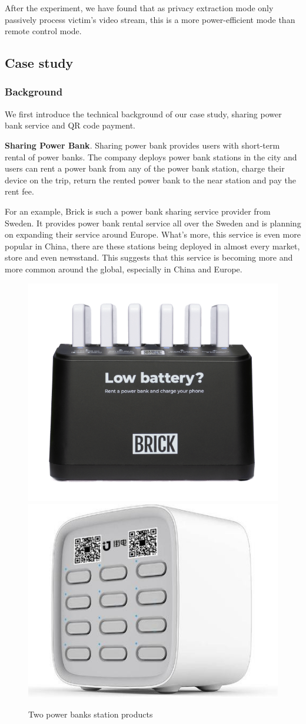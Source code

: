 After the experiment, we have found that as privacy extraction mode only passively process victim's video stream, this is a more power-efficient mode than remote control mode.

\subsection{Case study}
\label{subsec:case_study}
\subsubsection{Background}
We first introduce the technical background of our case study, sharing power bank service and QR code payment.

\textbf{Sharing Power Bank}. 
Sharing power bank provides users with short-term rental of power banks. 
The company deploys power bank stations in the city and users can rent a power bank from any of the power bank station, charge their device on the trip, return the rented power bank to the near station and pay the rent fee.

For an example, Brick is such a power bank sharing service provider from Sweden. It provides power bank rental service all over the Sweden and is planning on expanding their service around Europe. What's more, this service is even more popular in China, there are these stations being deployed in almost every market, store and even newsstand. This suggests that this service is becoming more and more common around the global, especially in China and Europe.

\begin{figure}[t]
	\centering
	\includegraphics[width=.4 \linewidth]{./Figs/Brick_station.png}
	\includegraphics[width=.4 \linewidth]{./Figs/jiedian.jpg}
	\caption{Two power banks station products}
	\label{fig:PBS_products}
\end{figure}

